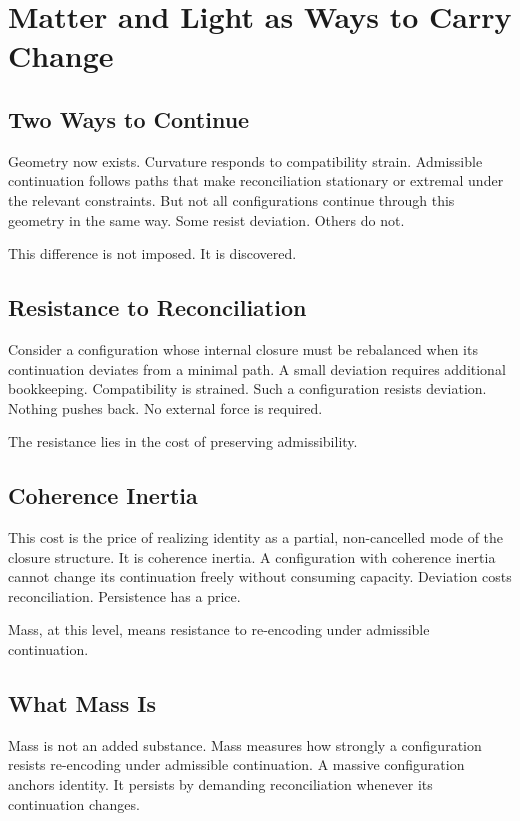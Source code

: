 \documentclass[11pt,twoside,openright]{book}
\begin{document}
\chapter{Matter and Light as Ways to Carry Change}

\section*{Two Ways to Continue}

Geometry now exists. Curvature responds to compatibility strain. Admissible continuation follows paths that make reconciliation stationary or extremal under the relevant constraints. But not all configurations continue through this geometry in the same way. Some resist deviation. Others do not.

This difference is not imposed. It is discovered.

\section*{Resistance to Reconciliation}

Consider a configuration whose internal closure must be rebalanced when its continuation deviates from a minimal path. A small deviation requires additional bookkeeping. Compatibility is strained. Such a configuration resists deviation. Nothing pushes back. No external force is required.

The resistance lies in the cost of preserving admissibility.

\section*{Coherence Inertia}

This cost is the price of realizing identity as a partial, non-cancelled mode of the closure structure. It is coherence inertia. A configuration with coherence inertia cannot change its continuation freely without consuming capacity. Deviation costs reconciliation. Persistence has a price.

Mass, at this level, means resistance to re-encoding under admissible continuation.

\section*{What Mass Is}

Mass is not an added substance. Mass measures how strongly a configuration resists re-encoding under admissible continuation. A massive configuration anchors identity. It persists by demanding reconciliation whenever its continuation changes.
\end{document}
